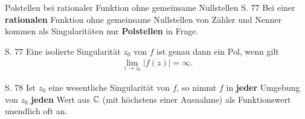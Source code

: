 \begin{bemerkung}{Polstellen bei rationaler Funktion ohne gemeinsame Nullstellen }{S. 77}
  Bei einer \textbf{rationalen} Funktion ohne gemeinsame Nullstellen von Zähler und Nenner kommen als Singularitäten nur \textbf{Polstellen} in Frage.
\end{bemerkung}

\begin{satz}[]{S. 77}
  \label{satz:7_4}
  Eine isolierte Singularität $z_0$ von $f$ ist genau dann ein Pol, wenn gilt
  \begin{align}
    \lim_{z \to z_0} |f(z)| = \infty .
  \end{align}
\end{satz}

\begin{satz}{S. 78}
  \label{satz:7_5}
  Ist $z_0$ eine wesentliche Singularität von $f$, so nimmt $f$ in \textbf{jeder} Umgebung von $z_0$ \textbf{jeden} Wert aus $\mathbb{C}$ (mit höchstens einer Ausnahme) als Funktionswert unendlich oft an.
\end{satz}
